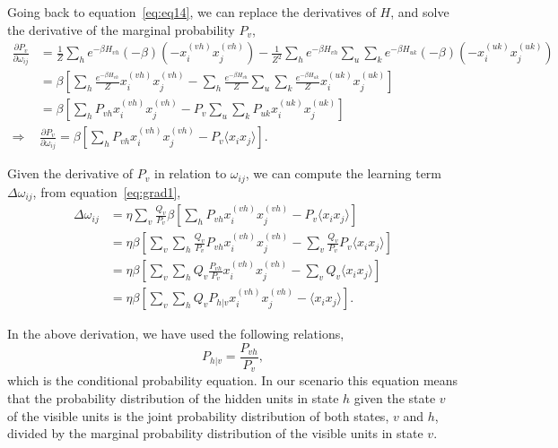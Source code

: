 Going back to equation~\ref{eq:eq14}, we can replace the derivatives of $H$, and solve the derivative of the marginal probability $P_{v}$,
\begin{equation}
  \begin{split}
    \frac{\partial P_{v}}{\partial \omega_{ij}} & = \frac{1}{Z} \sum_{h} e^{-\beta H_{vh}} (-\beta) (-x^{(vh)}_{i} x^{(vh)}_{j}) - \frac{1}{Z^{2}} \sum_{h} e^{-\beta H_{vh}} \sum_{u} \sum_{k} e^{-\beta H_{uk}} (-\beta) (-x^{(uk)}_{i} x^{(uk)}_{j}) \\
    & = \beta \left[ \sum_{h} \frac{e^{-\beta H_{vh}}}{Z} x^{(vh)}_{i} x^{(vh)}_{j} - \sum_{h} \frac{e^{-\beta H_{vh}}}{Z} \sum_{u} \sum_{k} \frac{e^{-\beta H_{uk}}}{Z} x^{(uk)}_{i} x^{(uk)}_{j}  \right] \\
    & = \beta \left[ \sum_{h} P_{vh} x^{(vh)}_{i} x^{(vh)}_{j} - P_{v} \sum_{u} \sum_{k} P_{uk} x^{(uk)}_{i} x^{(uk)}_{j} \right] \\
    \Rightarrow & \frac{\partial P_{v}}{\partial \omega_{ij}} = \beta \left[ \sum_{h} P_{vh} x^{(vh)}_{i} x^{(vh)}_{j} - P_{v} \langle x_{i} x_{j} \rangle  \right].
  \end{split}
  \label{eq:eq18}
\end{equation}

Given the derivative of $P_{v}$ in relation to $\omega_{ij}$, we can compute the learning term $\Delta \omega_{ij}$, from equation~\ref{eq:grad1},
\begin{equation}
  \begin{split}
    \Delta \omega_{ij} & = \eta \sum_{v} \frac{Q_{v}}{P_{v}} \beta \left[ \sum_{h} P_{vh} x^{(vh)}_{i} x^{(vh)}_{j} - P_{v} \langle x_{i} x_{j} \rangle \right]  \\
    & = \eta \beta \left[ \sum_{v} \sum_{h} \frac{Q_{v}}{P_{v}} P_{vh} x^{(vh)}_{i} x^{(vh)}_{j} - \sum_{v} \frac{Q_{v}}{P_{v}} P_{v} \langle x_{i} x_{j} \rangle \right] \\
    & = \eta \beta \left[ \sum_{v} \sum_{h} Q_{v} \frac{P_{vh}}{P_{v}} x^{(vh)}_{i} x^{(vh)}_{j} - \sum_{v} Q_{v} \langle x_{i} x_{j} \rangle \right] \\
    & = \eta \beta \left[ \sum_{v} \sum_{h} Q_{v} P_{h|v} x^{(vh)}_{i} x^{(vh)}_{j} - \langle x_{i} x_{j} \rangle \right].
  \end{split}
  \label{eq:learning_term2}
\end{equation}

In the above derivation, we have used the following relations,
\begin{equation}
  P_{h|v} = \frac{P_{vh}}{P_{v}},
  \label{eq:conditional_prob1}
\end{equation}
which is the conditional probability equation.
In our scenario this equation means that the probability distribution of the hidden units in state $h$ given the state $v$ of the visible units is the joint probability distribution of both states, $v$ and $h$, divided by the marginal probability distribution of the visible units in state $v$.

